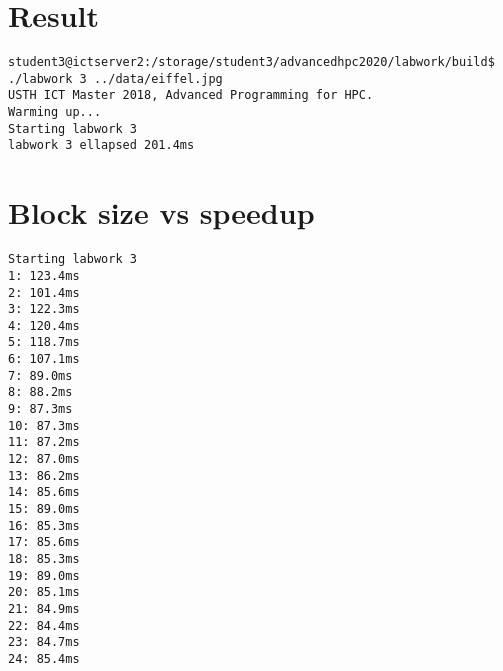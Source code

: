 \documentclass{article}
\begin{document}
\section{Result}
\begin{verbatim}
student3@ictserver2:/storage/student3/advancedhpc2020/labwork/build$ ./labwork 3 ../data/eiffel.jpg
USTH ICT Master 2018, Advanced Programming for HPC.
Warming up...
Starting labwork 3
labwork 3 ellapsed 201.4ms
\end{verbatim}
\section{Block size vs speedup}
\begin{verbatim}
Starting labwork 3
1: 123.4ms
2: 101.4ms
3: 122.3ms
4: 120.4ms
5: 118.7ms
6: 107.1ms
7: 89.0ms
8: 88.2ms
9: 87.3ms
10: 87.3ms
11: 87.2ms
12: 87.0ms
13: 86.2ms
14: 85.6ms
15: 89.0ms
16: 85.3ms
17: 85.6ms
18: 85.3ms
19: 89.0ms
20: 85.1ms
21: 84.9ms
22: 84.4ms
23: 84.7ms
24: 85.4ms
\end{verbatim}
\end{document}
